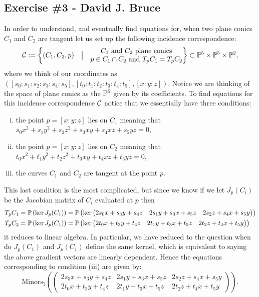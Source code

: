 
\subsection{Exercise \#3 - David J. Bruce}

In order to understand, and eventually find equations for, when two plane conics $C_1$ and $C_2$ are tangent let us set up the following incidence correspondence:
\[
\cC:=\left\{(C_1, C_2, p)\quad  \big|\quad \begin{matrix}\text{$C_1$ and $C_2$ plane conics}\\ \text{$p\in C_1\cap C_2$ and $T_pC_1=T_pC_2$}\end{matrix} \right\}\subset\P^5\times\P^5\times\P^2,
\]
where we think of our coordinates as $([s_0:s_1:s_2:s_3:s_4:s_5],[t_0:t_1:t_2:t_3:t_4:t_5],[x:y:z])$. Notice we are thinking of the space of plane conics as the $\P^5$ given by its coefficients. To find equations for this incidence correspondence $\cC$ notice that we essentially have three conditions:
\begin{enumerate}[(i)]
\item the point $p=[x:y:z]$ lies on $C_1$ meaning that $s_0x^2+s_1y^2+s_2z^2+s_3xy+s_4xz+s_5yz=0$,
\item the point $p=[x:y:z]$ lies on $C_2$ meaning that $t_0x^2+t_1y^2+t_2z^2+t_3xy+t_4xz+t_5yz=0$,
\item the curves $C_1$ and $C_2$ are tangent at the point $p$.
\end{enumerate}
This last condition is the most complicated, but since we know if we let $J_p(C_i)$ be the Jacobian matrix of $C_i$ evaluated at $p$ then 
\begin{align*}
T_pC_1&=\P\left(\ker J_p(C_1)\right)=\P\left(\ker\begin{pmatrix} 2s_0x+s_3y+s_4z & 2s_1y+s_3x+s_5z & 2s_2z+s_4x+s_5y\end{pmatrix}\right)\\
T_pC_2&=\P\left(\ker J_p(C_1)\right)=\P\left(\ker\begin{pmatrix} 2t_0x+t_3y+t_4z & 2t_1y+t_3x+t_5z & 2t_2z+t_4x+t_5y\end{pmatrix}\right)\\
\end{align*}
it reduces to linear algebra. In particular, we have reduced to the question when do $J_p(C_1)$ and $J_p(C_1)$ define the same kernel, which is equivalent to saying the above gradient vectors are linearly dependent. Hence the equations corresponding to condition (iii) are given by:
\[
\text{Minors}_{2}\left(\begin{pmatrix}
2s_0x+s_3y+s_4z & 2s_1y+s_3x+s_5z & 2s_2z+s_4x+s_5y\\
2t_0x+t_3y+t_4z & 2t_1y+t_3x+t_5z & 2t_2z+t_4x+t_5y
\end{pmatrix}\right).
\]
